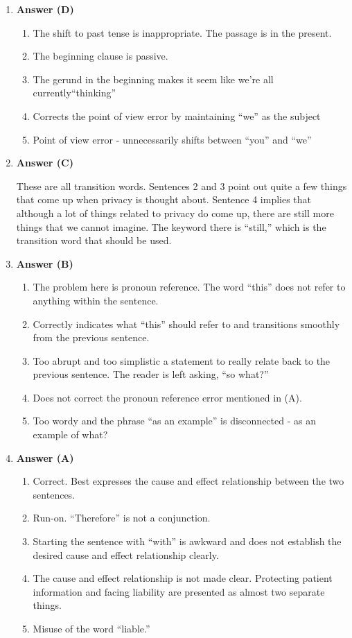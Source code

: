 \begin{enumerate}
\item \textbf{Answer (D)}

\begin{enumerate}[label=(\Alph*)]
\item The shift to past tense is inappropriate. The passage is in the present.
\item The beginning clause is passive.
\item The gerund in the beginning makes it seem like we're all currently``thinking''
\item Corrects the point of view error by maintaining ``we'' as the subject
\item Point of view error - unnecessarily shifts between ``you'' and ``we''
\end{enumerate}

\item \textbf{Answer (C)}

These are all transition words. Sentences 2 and 3 point out quite a few things that come up when privacy is thought about. Sentence 4 implies that although a lot of things related to privacy do come up, there are still more things that we cannot imagine. The keyword there is ``still,'' which is the transition word that should be used.

\item \textbf{Answer (B)}

\begin{enumerate}[label=(\Alph*)]
\item The problem here is pronoun reference. The word ``this'' does not refer to anything within the sentence.
\item Correctly indicates what ``this'' should refer to and transitions smoothly from the previous sentence.
\item Too abrupt and too simplistic a statement to really relate back to the previous sentence. The reader is left asking, ``so what?''
\item Does not correct the pronoun reference error mentioned in (A).
\item Too wordy and the phrase ``as an example'' is disconnected - as an example of what?
\end{enumerate}

\item \textbf{Answer (A)}

\begin{enumerate}[label=(\Alph*)]
\item Correct. Best expresses the cause and effect relationship between the two sentences.
\item Run-on. ``Therefore'' is not a conjunction.
\item Starting the sentence with ``with'' is awkward and does not establish the desired cause and effect relationship clearly.
\item The cause and effect relationship is not made clear. Protecting patient information and facing liability are presented as almost two separate things.
\item Misuse of the word ``liable.''
\end{enumerate}



\end{enumerate}
